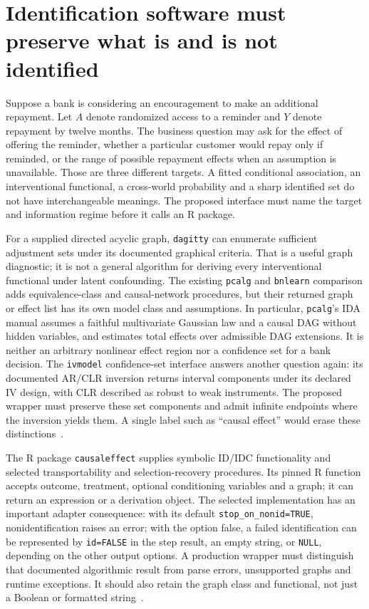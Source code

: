 \section{Identification software must preserve what is and is not identified}
\label{exec18:r-identification}

Suppose a bank is considering an encouragement to make an additional repayment. Let $A$ denote randomized access to a reminder and $Y$ denote repayment by twelve months. The business question may ask for the effect of offering the reminder, whether a particular customer would repay only if reminded, or the range of possible repayment effects when an assumption is unavailable. Those are three different targets. A fitted conditional association, an interventional functional, a cross-world probability and a sharp identified set do not have interchangeable meanings. The proposed interface must name the target and information regime before it calls an R package.

For a supplied directed acyclic graph, \texttt{dagitty} can enumerate sufficient adjustment sets under its documented graphical criteria. That is a useful graph diagnostic; it is not a general algorithm for deriving every interventional functional under latent confounding. The existing \texttt{pcalg} and \texttt{bnlearn} comparison adds equivalence-class and causal-network procedures, but their returned graph or effect list has its own model class and assumptions. In particular, \texttt{pcalg}'s IDA manual assumes a faithful multivariate Gaussian law and a causal DAG without hidden variables, and estimates total effects over admissible DAG extensions. It is neither an arbitrary nonlinear effect region nor a confidence set for a bank decision. The \texttt{ivmodel} confidence-set interface answers another question again: its documented AR/CLR inversion returns interval components under its declared IV design, with CLR described as robust to weak instruments. The proposed wrapper must preserve these set components and admit infinite endpoints where the inversion yields them. A single label such as “causal effect” would erase these distinctions~\citep{exec13_other_dagitty,exec13_pcalg,exec13_bnlearn,v12_sw_ivmodel}.

The R package \texttt{causaleffect} supplies symbolic ID/IDC functionality and selected transportability and selection-recovery procedures. Its pinned R function accepts outcome, treatment, optional conditioning variables and a graph; it can return an expression or a derivation object. The selected implementation has an important adapter consequence: with its default \texttt{stop\_on\_nonid=TRUE}, nonidentification raises an error; with the option false, a failed identification can be represented by \texttt{id=FALSE} in the step result, an empty string, or \texttt{NULL}, depending on the other output options. A production wrapper must distinguish that documented algorithmic result from parse errors, unsupported graphs and runtime exceptions. It should also retain the graph class and functional, not just a Boolean or formatted string~\citep{exec18_rid_causaleffect}.

